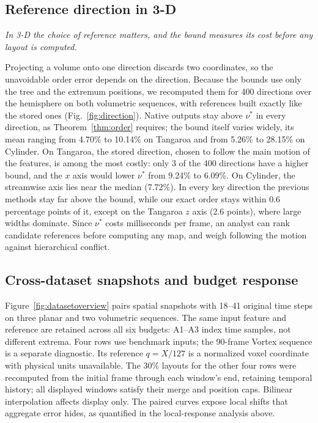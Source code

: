 \documentclass[review]{vgtc}                 %
\newcommand{\takeaway}[1]{\noindent\emph{#1}\par\smallskip}
\begin{document}
\subsection{Reference direction in 3-D}
\takeaway{In 3-D the choice of reference matters, and the bound measures its cost before any layout is computed.}
Projecting a volume onto one direction discards two coordinates, so the unavoidable order error depends on the direction. Because the bounds use only the tree and the extremum positions, we recomputed them for 400 directions over the hemisphere on both volumetric sequences, with references built exactly like the stored ones (Fig.~\ref{fig:direction}). Native outputs stay above $\nu^*$ in every direction, as Theorem~\ref{thm:order} requires; the bound itself varies widely, its mean ranging from 4.70\% to 10.14\% on Tangaroa and from 5.26\% to 28.15\% on Cylinder. On Tangaroa, the stored direction, chosen to follow the main motion of the features, is among the most costly: only 3 of the 400 directions have a higher bound, and the $x$ axis would lower $\nu^*$ from 9.24\% to 6.09\%. On Cylinder, the streamwise axis lies near the median (7.72\%). In every key direction the previous methods stay far above the bound, while our exact order stays within 0.6 percentage points of it, except on the Tangaroa $z$ axis (2.6 points), where large widths dominate. Since $\nu^*$ costs milliseconds per frame, an analyst can rank candidate references before computing any map, and weigh following the motion against hierarchical conflict.

\subsection{Cross-dataset snapshots and budget response}\label{sec:vortexcase}
Figure~\ref{fig:datasetoverview} pairs spatial snapshots with 18--41 original time steps on three planar and two volumetric sequences. The same input feature and reference are retained across all six budgets: A1--A3 index time samples, not different extrema. Four rows use benchmark inputs; the 90-frame Vortex sequence is a separate diagnostic. Its reference $q=X/127$ is a normalized voxel coordinate with physical units unavailable. The $30\%$ layouts for the other four rows were recomputed from the initial frame through each window's end, retaining temporal history; all displayed windows satisfy their merge and position caps. Bilinear interpolation affects display only. The paired curves expose local shifts that aggregate error hides, as quantified in the local-response analysis above.
\end{document}

